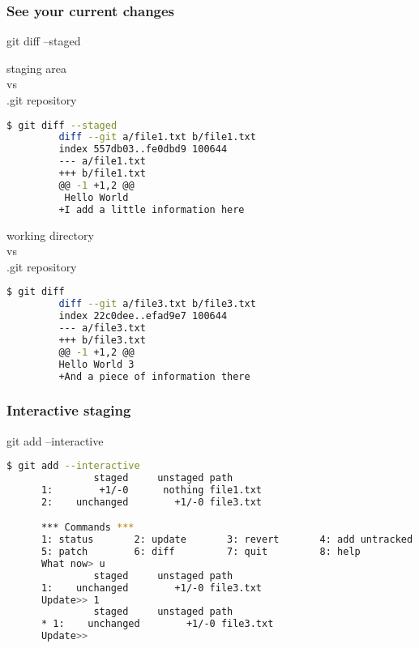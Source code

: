 \begin{frame}[fragile]\frametitle{See your current changes}
   \begin{center}
      \Huge git diff --staged\normalsize
   \end{center}
   \vspace{1em}
   \begin{minipage}{0.44\linewidth}
      \centering
      staging area\\
      vs\\
      .git repository
      \begin{lstlisting}[language=bash, style=bash, autogobble]
         $ git diff --staged
         diff --git a/file1.txt b/file1.txt
         index 557db03..fe0dbd9 100644
         --- a/file1.txt
         +++ b/file1.txt
         @@ -1 +1,2 @@
          Hello World
         +I add a little information here
      \end{lstlisting}
   \end{minipage}
   \hfill
   \begin{minipage}{0.44\linewidth}
      \centering
      working directory\\
      vs\\
      .git repository
      \begin{lstlisting}[language=bash, style=bash, autogobble]
         $ git diff
         diff --git a/file3.txt b/file3.txt
         index 22c0dee..efad9e7 100644
         --- a/file3.txt
         +++ b/file3.txt
         @@ -1 +1,2 @@
         Hello World 3
         +And a piece of information there
      \end{lstlisting}
   \end{minipage}
\end{frame}

\begin{frame}[fragile]\frametitle{Interactive staging}
   \begin{center}
      \Huge git add --interactive\normalsize
   \end{center}
   \vspace{1em}
   \begin{lstlisting}[language=bash, style=bash, autogobble]
      $ git add --interactive
               staged     unstaged path
      1:        +1/-0      nothing file1.txt
      2:    unchanged        +1/-0 file3.txt

      *** Commands ***
      1: status       2: update       3: revert       4: add untracked
      5: patch        6: diff         7: quit         8: help
      What now> u
               staged     unstaged path
      1:    unchanged        +1/-0 file3.txt
      Update>> 1
               staged     unstaged path
      * 1:    unchanged        +1/-0 file3.txt
      Update>>
   \end{lstlisting}
\end{frame}


